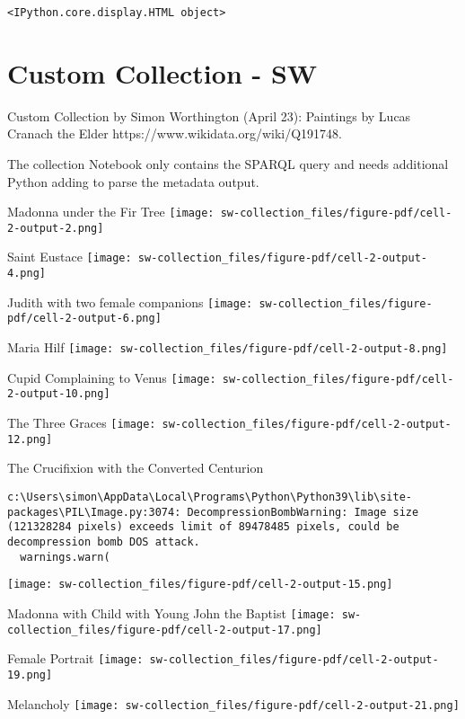 \documentclass[
  letterpaper,
]{book}
\begin{document}
\begin{verbatim}
<IPython.core.display.HTML object>
\end{verbatim}


\hypertarget{custom-collection---sw}{%
\chapter{Custom Collection - SW}\label{custom-collection---sw}}

Custom Collection by Simon Worthington (April 23): Paintings by Lucas
Cranach the Elder https://www.wikidata.org/wiki/Q191748.

The collection Notebook only contains the SPARQL query and needs
additional Python adding to parse the metadata output.

Madonna under the Fir Tree
\texttt{[image: sw-collection\_files/figure-pdf/cell-2-output-2.png]}

Saint Eustace
\texttt{[image: sw-collection\_files/figure-pdf/cell-2-output-4.png]}

Judith with two female companions
\texttt{[image: sw-collection\_files/figure-pdf/cell-2-output-6.png]}

Maria Hilf
\texttt{[image: sw-collection\_files/figure-pdf/cell-2-output-8.png]}

Cupid Complaining to Venus
\texttt{[image: sw-collection\_files/figure-pdf/cell-2-output-10.png]}

The Three Graces
\texttt{[image: sw-collection\_files/figure-pdf/cell-2-output-12.png]}

The Crucifixion with the Converted Centurion

\begin{verbatim}
c:\Users\simon\AppData\Local\Programs\Python\Python39\lib\site-packages\PIL\Image.py:3074: DecompressionBombWarning: Image size (121328284 pixels) exceeds limit of 89478485 pixels, could be decompression bomb DOS attack.
  warnings.warn(
\end{verbatim}

\texttt{[image: sw-collection\_files/figure-pdf/cell-2-output-15.png]}

Madonna with Child with Young John the Baptist
\texttt{[image: sw-collection\_files/figure-pdf/cell-2-output-17.png]}

Female Portrait
\texttt{[image: sw-collection\_files/figure-pdf/cell-2-output-19.png]}

Melancholy
\texttt{[image: sw-collection\_files/figure-pdf/cell-2-output-21.png]}
\end{document}
